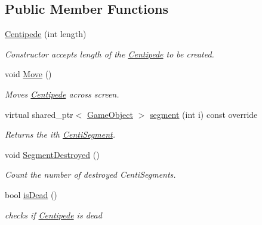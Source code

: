 \subsection*{Public Member Functions}
\begin{DoxyCompactItemize}
\item 
\mbox{\label{class_centipede_a694d8add5c6962a8a89eb3e0a556d4a0}} 
\mbox{\hyperlink{class_centipede_a694d8add5c6962a8a89eb3e0a556d4a0}{Centipede}} (int length)
\begin{DoxyCompactList}\small\item\em Constructor accepts length of the \mbox{\hyperlink{class_centipede}{Centipede}} to be created. \end{DoxyCompactList}\item 
\mbox{\label{class_centipede_ae460a56f2f7d875ffafa16166aa5d6b6}} 
void \mbox{\hyperlink{class_centipede_ae460a56f2f7d875ffafa16166aa5d6b6}{Move}} ()
\begin{DoxyCompactList}\small\item\em Moves \mbox{\hyperlink{class_centipede}{Centipede}} across screen. \end{DoxyCompactList}\item 
virtual shared\+\_\+ptr$<$ \mbox{\hyperlink{class_game_object}{Game\+Object}} $>$ \mbox{\hyperlink{class_centipede_ae722488780d0d19e63510647b5fe108c}{segment}} (int i) const override
\begin{DoxyCompactList}\small\item\em Returns the ith \mbox{\hyperlink{class_centi_segment}{Centi\+Segment}}. \end{DoxyCompactList}\item 
\mbox{\label{class_centipede_a850f32fbd537efc5d226d48e04b91d7f}} 
void \mbox{\hyperlink{class_centipede_a850f32fbd537efc5d226d48e04b91d7f}{Segment\+Destroyed}} ()
\begin{DoxyCompactList}\small\item\em Count the number of destroyed Centi\+Segments. \end{DoxyCompactList}\item 
bool \mbox{\hyperlink{class_centipede_a3d69f0ef4b57cf4b9c1beb1284f2f738}{is\+Dead}} ()
\begin{DoxyCompactList}\small\item\em checks if \mbox{\hyperlink{class_centipede}{Centipede}} is dead \end{DoxyCompactList}\item 

\end{DoxyCompactItemize}
